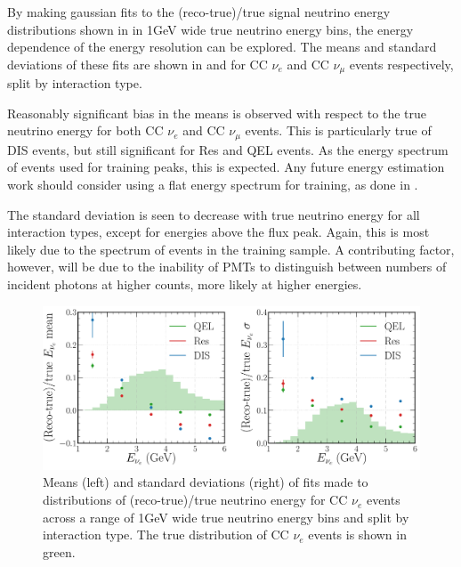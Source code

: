 By making gaussian fits to the (reco-true)/true signal neutrino energy distributions shown in
 in \unit{1}{GeV} wide true neutrino energy bins, the energy
dependence of the energy resolution can be explored. The means and standard deviations of these
fits are shown in  and  for CC
$\nu_{e}$ and CC $\nu_{\mu}$ events respectively, split by interaction type.

Reasonably significant bias in the means is observed with respect to the true neutrino energy for
both CC $\nu_{e}$ and CC $\nu_{\mu}$ events. This is particularly true of DIS events, but still
significant for Res and QEL events. As the energy spectrum of events used for training peaks, this
is expected. Any future energy estimation work should consider using a flat energy spectrum for
training, as done in .

The standard deviation is seen to decrease with true neutrino energy for all interaction types,
except for energies above the flux peak. Again, this is most likely due to the spectrum of events
in the training sample. A contributing factor, however, will be due to the inability of PMTs to
distinguish between numbers of incident photons at higher counts, more likely at higher energies.

\begin{figure} %
    \includegraphics[width=\textwidth]{diagrams/7-results/final_energy_nuel.pdf}
    \caption[Means and standard deviations of fits to $\nu_{e}$ energy distributions]
    {Means (left) and standard deviations (right) of fits made to distributions of
        (reco-true)/true neutrino energy for CC $\nu_{e}$ events across a range of \unit{1}{GeV}
        wide true neutrino energy bins and split by interaction type. The true distribution of CC
        $\nu_{e}$ events is shown in green.}
    \label{fig:final_energy_nuel}
\end{figure}

